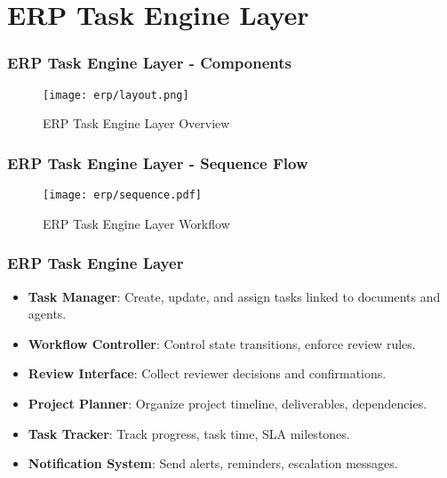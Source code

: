 \section{ERP Task Engine Layer}


\begin{frame}
    \frametitle{ERP Task Engine Layer - Components}
    \begin{figure}
        \centering
        \texttt{[image: erp/layout.png]} %
        \caption{ERP Task Engine Layer Overview}
    \end{figure}
\end{frame}

\begin{frame}
    \frametitle{ERP Task Engine Layer - Sequence Flow}
    \begin{figure}
        \centering
        \texttt{[image: erp/sequence.pdf]} %
        \caption{ERP Task Engine Layer Workflow}
    \end{figure}
\end{frame}


\begin{frame}
    \frametitle{ERP Task Engine Layer }
    \begin{itemize}
        \item \textbf{Task Manager}: Create, update, and assign tasks linked to documents and agents.
        \item \textbf{Workflow Controller}: Control state transitions, enforce review rules.
        \item \textbf{Review Interface}: Collect reviewer decisions and confirmations.
        \item \textbf{Project Planner}: Organize project timeline, deliverables, dependencies.
        \item \textbf{Task Tracker}: Track progress, task time, SLA milestones.
        \item \textbf{Notification System}: Send alerts, reminders, escalation messages.
    \end{itemize}
\end{frame}



